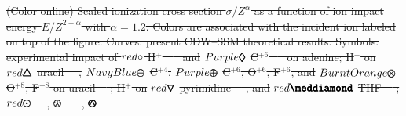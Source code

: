 \documentclass[10pt,showpacs,showkeys,twocolumn]{revtex4-1} %
\providecommand{\DIFdel}[1]{{\protect\color{red}\sout{#1}}}                      %
\providecommand{\DIFdelFL}[1]{\DIFdel{#1}} %
\begin{document}
{%
\DIFdelFL{(Color online) Scaled ionization cross section $\sigma/Z^{\alpha}$ as a function of ion impact energy $E/Z^{2-\alpha}$ with $\alpha=1.2$. Colors are associated with the incident ion labeled on top of the figure. Curves: present CDW--SSM theoretical results. Symbols: experimental impact of 
\mbox{\LARGE$\color{red}\circ$} H$^+$~\mbox{%
\cite{iriki2011} }\hspace{0pt}%
and
}%
\DIFdelFL{$\color{Purple}\pmb{\lozenge}$}%
\DIFdelFL{C$^{+6}$ \mbox{%
\cite{tribedi2019} }\hspace{0pt}%
on adenine;
H$^+$ on }%
\DIFdelFL{$\color{red}\pmb{\triangle}$}%
\DIFdelFL{uracil~\mbox{%
\cite{itoh2013}}\hspace{0pt}%
, 
}%
\DIFdelFL{$\color{NavyBlue}\pmb{\ominus}$}%
\DIFdelFL{C$^{+4}$, 
}%
\DIFdelFL{$\color{Purple}\pmb{\oplus}$}%
\DIFdelFL{C$^{+6}$, O$^{+6}$, F$^{+6}$, and 
}%
\DIFdelFL{$\color{BurntOrange}\pmb{\otimes}$}%
\DIFdelFL{O$^{+8}$, F$^{+8}$ on uracil~\mbox{%
\cite{agnihotri2012,agnihotri2013}}\hspace{0pt}%
;
H$^+$ on }%
\DIFdelFL{$\color{red}\pmb{\triangledown}$}%
\DIFdelFL{pyrimidine~\mbox{%
\cite{wolff2014}}\hspace{0pt}%
, and
}%
\DIFdelFL{$\color{red}\pmb{\meddiamond}$}%
\DIFdelFL{THF~\mbox{%
\cite{wang2016}}\hspace{0pt}%
;
\mbox{\fontsize{11}{20}$\color{red}\pmb{\odot}$}~\mbox{%
\cite{Luna2007}}\hspace{0pt}%
, 
}%
\DIFdelFL{$\pmb{\logof}$}%
\DIFdelFL{~\mbox{%
\cite{Rudd86}}\hspace{0pt}%
, 
}%
\DIFdelFL{$\pmb{\varowedge}$}%
\DIFdelFL{~\mbox{%
\cite{pRudd85}}\hspace{0pt}%
}}
\end{document}
